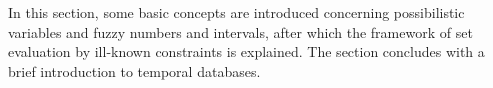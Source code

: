 In this section, some basic concepts are introduced concerning possibilistic variables and fuzzy numbers and intervals, after which the framework of set evaluation by ill-known constraints \cite{Pon11} is explained. The section concludes with a brief introduction to temporal databases.





